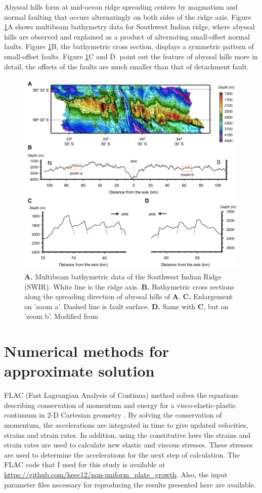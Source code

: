 \documentclass[letterpaper,12pt,notitle]{memphisthesis}                     %
\begin{document}
Abyssal hills form at mid-ocean ridge spreading centers by magmatism and normal faulting that occurs alternatingly on both sides of the ridge axis. Figure \ref{fig:abyssalhill}A shows multibeam bathymetry data for Southwest Indian ridge, where abyssal hills are observed and explained as a product of alternating small-offset normal faults. Figure \ref{fig:abyssalhill}B, the bathymetric cross section, displays a symmetric pattern of small-offset faults. Figure \ref{fig:abyssalhill}C and D. point out the feature of abyssal hills more in detail, the offsets of the faults are much smaller than that of detachment fault.
%
\begin{figure}[!htb]
	\centering
	\includegraphics[width=0.98\linewidth]{./figs/abyssalhill.pdf}
	\caption{\textbf{A.} Multibeam bathymetric data of the Southwest Indian Ridge (SWIR). White line is the ridge axis. \textbf{B.} Bathymetric cross sections along the spreading direction of abyssal hills of \textbf{A}. \textbf{C.} Enlargement on 'zoom a'. Dashed line is fault surface. \textbf{D.} Same with \textbf{C}, but on 'zoom b'. Modified from \citet{Mendel2003}}
	\label{fig:abyssalhill}
\end{figure}
%

\section{Numerical methods for approximate solution}
FLAC (Fast Lagrangian Analysis of Continua) method \citep{Cundall1982, Poliakov1993} solves the equations describing conservation of momentum and energy for a visco-elastic-plastic continuum in 2-D Cartesian geometry \citep{Lavier2002}. By solving the conservation of momentum, the accelerations are integrated in time to give updated velocities, strains and strain rates. In addition, using the constitutive laws the strains and strain rates are used to calculate new elastic and viscous stresses. These stresses are used to determine the accelerations for the next step of calculation. The FLAC code that I used for this study is available at \url{https://github.com/heec12/non-uniform_plate_growth}. Also, the input parameter files necessary for reproducing the results presented here are available.
\end{document}
